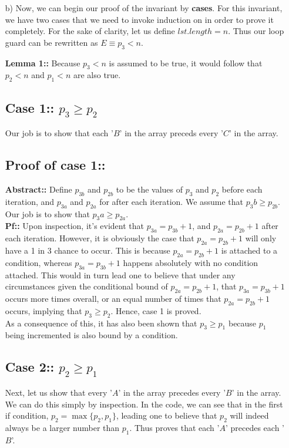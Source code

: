 \documentclass[12pt]{article}
\begin{document}
\begin{itemize}
    \item[b)] Now, we can begin our proof of the invariant by \textbf{cases}. For this invariant, we have two cases that we need to invoke induction on in order to prove it completely. For the sake of clarity, let us define $lst.length=n$. Thus our loop guard can be rewritten as $E\equiv p_3<n$.
    \item[]\textbf{Lemma 1::} Because $p_3<n$ is assumed to be true, it would follow that $p_2<n$ and $p_1<n$ are also true.
    \item[]\subsection*{Case 1:: $p_3\geq p_2$}
    Our job is to show that each '$B$' in the array preceds every '$C$' in the array.

    \subsection*{Proof of case 1::}
    \textbf{Abstract::} Define $p_{3b}$ and $p_{2b}$ to be the values of $p_3$ and $p_2$ before each iteration, and $p_{3a}$ and $p_{2a}$ for after each iteration. We assume that $p_3b\geq p_{2b}$. Our job is to show that $p_3a\geq p_{2a}$.\\
    \textbf{Pf::} Upon inspection, it's evident that $p_{3a}=p_{3b}+1$, and $p_{2a}=p_{2b}+1$ after each iteration. However, it is obviously the case that $p_{2a}=p_{2b}+1$ will only have a 1 in 3 chance to occur. This is because $p_{2a}=p_{2b}+1$ is attached to a condition, whereas $p_{3a}=p_{3b}+1$ happens absolutely with no condition attached. This would in turn lead one to believe that under any circumstances given the conditional bound of $p_{2a}=p_{2b}+1$, that $p_{3a}=p_{3b}+1$ occurs more times overall, or an equal number of times that $p_{2a}=p_{2b}+1$ occurs, implying that $p_3\geq p_2$. Hence, case 1 is proved.\\As a consequence of this, it has also been shown that $p_3\geq p_1$ because $p_1$ being incremented is also bound by a condition.

    \item[]\subsection*{Case 2:: $p_2\geq p_1$}
    Next, let us show that every '$A$' in the array precedes every '$B$' in the array. We can do this simply by inspection. In the code, we can see that in the first if condition, $p_2=\max\{p_2,p_1\}$, leading one to believe that $p_2$ will indeed always be a larger number than $p_1$. Thus proves that each '$A$' precedes each '$B$'.


\end{itemize}
\end{document}
